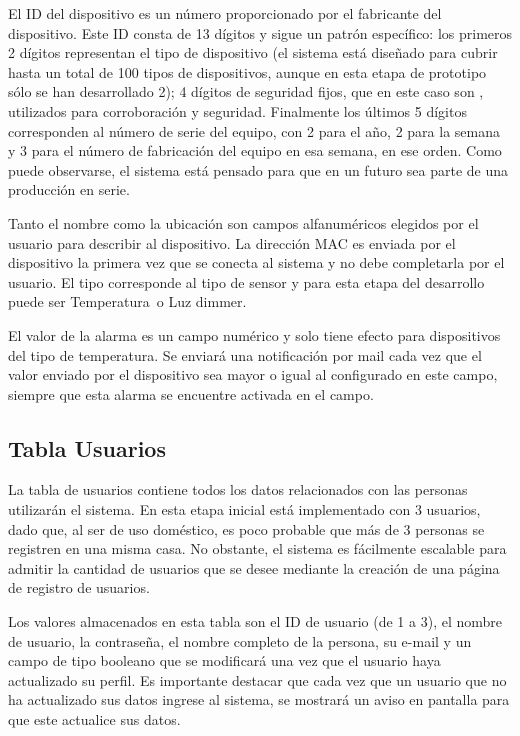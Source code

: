 El ID del dispositivo es un número proporcionado por el fabricante del dispositivo. Este ID consta de 13 dígitos y sigue un patrón específico: los primeros 2 dígitos representan el tipo de dispositivo (el sistema está diseñado para cubrir hasta un total de 100 tipos de dispositivos, aunque en esta etapa de prototipo sólo se han desarrollado 2); 4 dígitos de seguridad fijos, que en este caso son \textquotedbl , utilizados para corroboración y seguridad. Finalmente los últimos 5 dígitos corresponden al número de serie del equipo, con 2 para el año, 2 para la semana y 3 para el número de fabricación del equipo en esa semana, en ese orden. Como puede observarse, el sistema está pensado para que en un futuro sea parte de una producción en serie.

Tanto el nombre como la ubicación son campos alfanuméricos elegidos por el usuario para describir al dispositivo. La dirección MAC es enviada por el dispositivo la primera vez que se conecta al sistema y no debe completarla por el usuario. El tipo corresponde al tipo de sensor y para esta etapa del desarrollo puede ser \textquotedbl Temperatura\textquotedbl\ o \textquotedbl Luz dimmer\textquotedbl.

El valor de la alarma es un campo numérico y solo tiene efecto para dispositivos del tipo de temperatura. Se enviará una notificación por mail cada vez que el valor enviado por el dispositivo sea mayor o igual al configurado en este campo, siempre que esta alarma se encuentre activada en el campo.

\subsection{Tabla Usuarios}

La tabla de usuarios contiene todos los datos relacionados con las personas utilizarán el sistema. En esta etapa inicial está implementado con 3 usuarios, dado que, al ser de uso doméstico, es poco probable que más de 3 personas se registren en una misma casa. No obstante, el sistema es fácilmente escalable para admitir la cantidad de usuarios que se desee mediante la creación de una página de registro de usuarios.

Los valores almacenados en esta tabla son el ID de usuario (de 1 a 3), el nombre de usuario, la contraseña, el nombre completo de la persona, su e-mail y un campo de tipo booleano que se modificará una vez que el usuario haya actualizado su perfil. Es importante destacar que cada vez que un usuario que no ha actualizado sus datos ingrese al sistema, se mostrará un aviso en pantalla para que este actualice sus datos.

